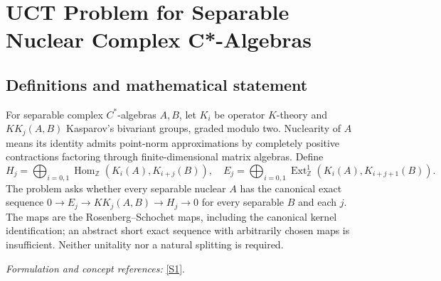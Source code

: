 \documentclass[11pt,a4paper]{article}
\newcommand{\Z}{\mathbb{Z}}
\newcommand{\sref}[2]{\hyperlink{source:#1:#2}{[S#2]}}
\newif\ifshowcatalogue
\newcommand{\cataloguescope}[1]{\ifshowcatalogue
 \paragraph{Exact scope in the supplied catalogue.}
 \begin{quote}\small #1\end{quote}\fi}
\begin{document}
\setcounter{section}{202}
\clearpage
\section{\texorpdfstring{UCT Problem for Separable Nuclear Complex C*-Algebras}{UCT Problem for Separable Nuclear Complex C*-Algebras}}\label{203}
\subsection{Definitions and mathematical statement}
For separable complex $C^*$-algebras $A,B$, let $K_i$ be operator $K$-theory and $KK_j(A,B)$ Kasparov's bivariant groups, graded modulo two. Nuclearity of $A$ means its identity admits point-norm approximations by completely positive contractions factoring through finite-dimensional matrix algebras. Define
\[
 H_j=\bigoplus_{i=0,1}\operatorname{Hom}_{\Z}(K_i(A),K_{i+j}(B)),\quad
 E_j=\bigoplus_{i=0,1}\operatorname{Ext}^1_{\Z}(K_i(A),K_{i+j+1}(B)).
\]
The problem asks whether every separable nuclear $A$ has the canonical exact sequence
$0\to E_j\to KK_j(A,B)\to H_j\to0$ for every separable $B$ and each $j$. The maps are the Rosenberg--Schochet maps, including the canonical kernel identification; an abstract short exact sequence with arbitrarily chosen maps is insufficient. Neither unitality nor a natural splitting is required.
\par\smallskip\textit{Formulation and concept references:} \sref{203}{1}.
\cataloguescope{Decide whether EVERY separable nuclear complex C*-algebra A, unital or nonunital, satisfies the Rosenberg-Schochet UCT: for EVERY separable complex C*-algebra B, unital or nonunital, and each j in Z/2, the canonical UCT sequence 0 -> E\_j(A,B) -> KK\_j(A,B) -> H\_j(A,B) -> 0 is exact. Here H\_j(A,B)=direct\_sum\_(i=0,1) Hom\_Z(K\_i(A),K\_(i+j)(B)) and E\_j(A,B)=direct\_sum\_(i=0,1) Ext\_Z\textasciicircum{}1(K\_i(A),K\_(i+j+1)(B)), with indices modulo2. The right map is the natural map on K-theory induced by KK classes; the left is the canonical inverse extension-class identification of the kernel, not an arbitrary chosen injection. No canonical or natural splitting is required. Equivalently, every such A belongs to the Rosenberg-Schochet bootstrap category of separable nuclear C*-algebras, or is KK-equivalent to a separable commutative complex C*-algebra.}
\end{document}
